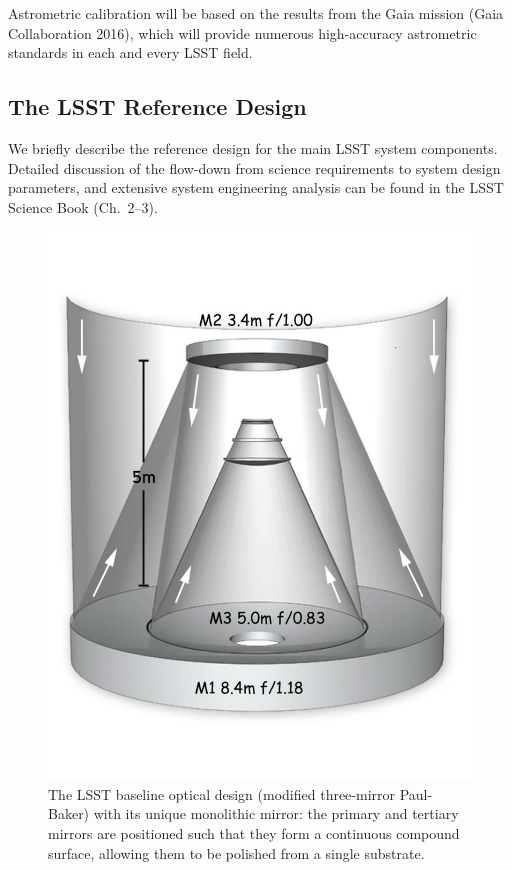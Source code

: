 \documentclass{emulateapj}
\begin{document}
Astrometric calibration will be based on the results from the Gaia mission (Gaia Collaboration 2016), which will provide 
numerous high-accuracy astrometric standards in each and every LSST field. 

\subsection{     The LSST  Reference Design    }

We briefly describe the reference design for the main LSST system components. 
Detailed discussion of the flow-down from science requirements to system 
design parameters, and extensive system engineering analysis can be 
found in the LSST Science Book (Ch.~2--3). 

\begin{figure}
\vskip -0.5in
\includegraphics[width=1.0\hsize,clip]{mirrors.pdf}
\vskip -0.5in
\caption{The LSST baseline optical design (modified three-mirror
  Paul-Baker) with its unique 
monolithic mirror: the primary and tertiary mirrors are positioned such 
that they form a continuous compound surface, allowing them to be polished 
from a single substrate.}
\label{Fig:optics}
\end{figure}
\end{document}
